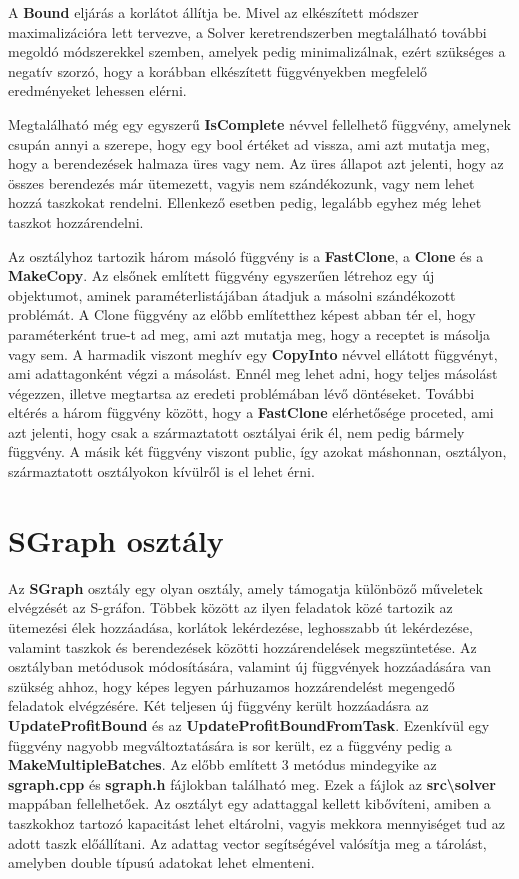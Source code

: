 A \textbf{Bound} eljárás a korlátot állítja be. Mivel az elkészített módszer maximalizációra lett tervezve, a Solver keretrendszerben megtalálható további megoldó módszerekkel szemben, amelyek pedig minimalizálnak, ezért szükséges a negatív szorzó, hogy a korábban elkészített függvényekben megfelelő eredményeket lehessen elérni.

Megtalálható még egy egyszerű \textbf{IsComplete} névvel fellelhető függvény, amelynek csupán annyi a szerepe, hogy egy bool értéket ad vissza, ami azt mutatja meg, hogy a berendezések halmaza üres vagy nem. Az üres állapot azt jelenti, hogy az összes berendezés már ütemezett, vagyis nem szándékozunk, vagy nem lehet hozzá taszkokat rendelni. Ellenkező esetben pedig, legalább egyhez még lehet taszkot hozzárendelni.

Az osztályhoz tartozik három másoló függvény is a \textbf{FastClone}, a \textbf{Clone} és a \textbf{MakeCopy}. Az elsőnek említett függvény egyszerűen létrehoz egy új objektumot, aminek paraméterlistájában átadjuk a másolni szándékozott problémát. A Clone függvény az előbb említetthez képest abban tér el, hogy paraméterként true-t ad meg, ami azt mutatja meg, hogy a receptet is másolja vagy sem. A harmadik viszont meghív egy \textbf{CopyInto} névvel ellátott függvényt, ami adattagonként végzi a másolást. Ennél meg lehet adni, hogy teljes másolást végezzen, illetve megtartsa az eredeti problémában lévő döntéseket. További eltérés a három függvény között, hogy a \textbf{FastClone} elérhetősége proceted, ami azt jelenti, hogy csak a származtatott osztályai érik él, nem pedig bármely függvény. A másik két függvény viszont public, így azokat máshonnan, osztályon, származtatott osztályokon kívülről is el lehet érni. 

\section{SGraph osztály}
Az \textbf{SGraph} osztály egy olyan osztály, amely támogatja különböző műveletek elvégzését az S-gráfon. Többek között az ilyen feladatok közé tartozik az ütemezési élek hozzáadása, korlátok lekérdezése, leghosszabb út lekérdezése, valamint taszkok és berendezések közötti hozzárendelések megszüntetése. Az osztályban metódusok módosítására, valamint új függvények hozzáadására van szükség ahhoz, hogy képes legyen párhuzamos hozzárendelést megengedő feladatok elvégzésére. Két teljesen új függvény került hozzáadásra az \textbf{UpdateProfitBound} és az \textbf{UpdateProfitBoundFromTask}. Ezenkívül egy függvény nagyobb megváltoztatására is sor került, ez a függvény pedig a \textbf{MakeMultipleBatches}. Az előbb említett 3 metódus mindegyike az \textbf{sgraph.cpp} és \textbf{sgraph.h} fájlokban található meg. Ezek a fájlok az \textbf{src\textbackslash solver} mappában fellelhetőek. Az osztályt egy adattaggal kellett kibővíteni, amiben a taszkokhoz tartozó kapacitást lehet eltárolni, vagyis mekkora mennyiséget tud az adott taszk előállítani. Az adattag vector segítségével valósítja meg a tárolást, amelyben double típusú adatokat lehet elmenteni.
